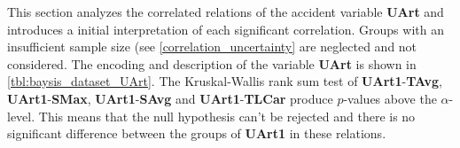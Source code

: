 This section analyzes the correlated relations of the accident variable \textbf{UArt} and introduces a initial interpretation of each significant correlation. Groups with an insufficient sample size (see \cref{correlation_uncertainty} are neglected and not considered. The encoding and description of the variable \textbf{UArt} is shown in \cref{tbl:baysis_dataset_UArt}. The Kruskal-Wallis rank sum test of \textbf{UArt1}-\textbf{TAvg}, \textbf{UArt1}-\textbf{SMax}, \textbf{UArt1}-\textbf{SAvg} and \textbf{UArt1}-\textbf{TLCar} produce $p$-values above the $\alpha$-level. This means that the null hypothesis can't be rejected and there is no significant difference between the groups of \textbf{UArt1} in these relations. 

